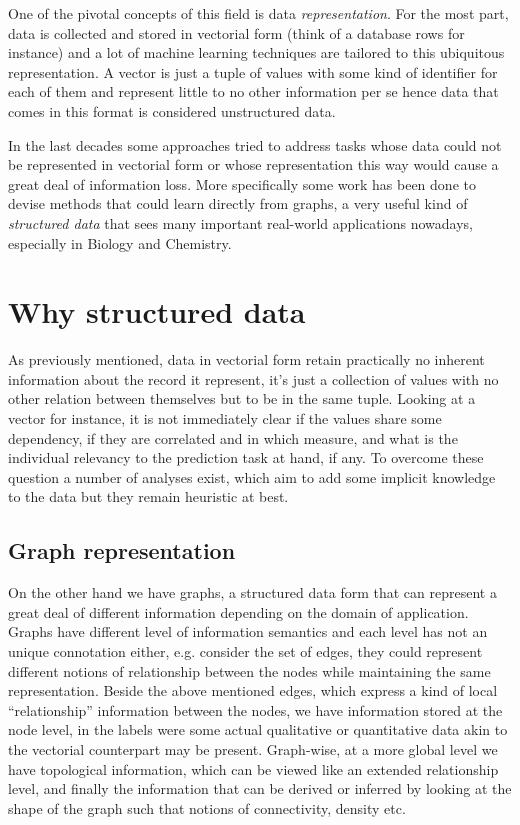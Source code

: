One of the pivotal concepts of this field is data \emph{representation}.
For the most part, data is collected and stored in vectorial form (think of
a database rows for instance) and a lot of machine learning techniques are
tailored to this ubiquitous representation.
A vector is just a tuple of values with some kind of identifier for each of them
and represent little to no other information per se hence data that comes in
this format is considered unstructured data.

In the last decades some approaches tried to address tasks whose data could
not be represented in vectorial form or whose representation this way would cause
a great deal of information loss.
More specifically some work has been done to devise methods that could learn
directly from graphs, a very useful kind of \emph{structured data} that sees many
important real-world applications nowadays, especially in Biology and Chemistry.


\section{Why structured data}
As previously mentioned, data in vectorial form retain practically no inherent
information about the record it represent, it's just a collection of values with
no other relation between themselves but to be in the same tuple.
Looking at a vector for instance, it is not immediately clear if the values share
some dependency, if they are correlated and in which measure, and what is the
individual relevancy to the prediction task at hand, if any.
To overcome these question a number of analyses exist, which aim to add some
implicit knowledge to the data but they remain heuristic at best.

\subsection{Graph representation}
On the other hand we have graphs, a structured data form that can represent
a great deal of different information depending on the domain of application.
Graphs have different level of information semantics and each level has not an
unique connotation either, e.g. consider the set of edges, they could represent
different notions of relationship between the nodes while maintaining the same
representation.
Beside the above mentioned edges, which express a kind of local ``relationship''
information between the nodes, we have information stored at the node level, in the
labels were some actual qualitative or quantitative data akin to the vectorial
counterpart may be present.
Graph-wise, at a more global level we have topological information, which can be
viewed like an extended relationship level, and finally the information that can
be derived or inferred by looking at the shape of the graph such that notions
of connectivity, density etc.

